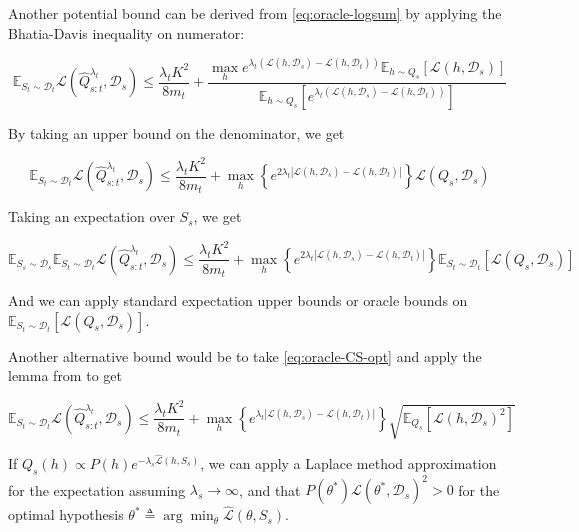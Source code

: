 \documentclass[letterpaper]{article}
\theoremstyle{definition}
\begin{document}
Another potential bound can be derived from \eqref{eq:oracle-logsum} by applying the Bhatia-Davis inequality on numerator:

$$\mathbb{E}_{S_t\sim \mathcal{D}_t}\mathcal{L}( \hat{Q}^{\lambda_t}_{s:t},\mathcal{D}_s)\leq \frac{\lambda_t K^2}{8m_t}+\frac{\max_h e^{\lambda_t(\mathcal{L}(h,\mathcal{D}_s)-\mathcal{L}(h,\mathcal{D}_t))}\mathbb{E}_{h\sim Q_s}\left [\mathcal{L}(h,\mathcal{D}_s) \right ]}{\mathbb{E}_{h\sim Q_s}\left [e^{\lambda_t(\mathcal{L}(h,\mathcal{D}_s)-\mathcal{L}(h,\mathcal{D}_t))}\right ]}$$

By taking an upper bound on the denominator, we get 

$$\mathbb{E}_{S_t\sim \mathcal{D}_t}\mathcal{L}( \hat{Q}^{\lambda_t}_{s:t},\mathcal{D}_s)\leq \frac{\lambda_t K^2}{8m_t}+\max_h \left \{ e^{2\lambda_t|\mathcal{L}(h,\mathcal{D}_s)-\mathcal{L}(h,\mathcal{D}_t)|}\right \}\mathcal{L}(Q_s,\mathcal{D}_s)$$

Taking an expectation over $S_s$, we get

\begin{equation}
\mathbb{E}_{S_s\sim \mathcal{D}_s}\mathbb{E}_{S_t\sim \mathcal{D}_t}\mathcal{L}( \hat{Q}^{\lambda_t}_{s:t},\mathcal{D}_s)\leq \frac{\lambda_t K^2}{8m_t}+\max_h \left \{ e^{2\lambda_t|\mathcal{L}(h,\mathcal{D}_s)-\mathcal{L}(h,\mathcal{D}_t)|}\right \}\mathbb{E}_{S_t\sim \mathcal{D}_t}\left [\mathcal{L}(Q_s,\mathcal{D}_s)\right ]
\end{equation}

And we can apply standard expectation upper bounds or oracle bounds on $\mathbb{E}_{S_t\sim \mathcal{D}_t}\left [\mathcal{L}(Q_s,\mathcal{D}_s)\right ]$.

Another alternative bound would be to take \eqref{eq:oracle-CS-opt} and apply the lemma from \citet{cover1996universal} to get 

$$\mathbb{E}_{S_t\sim \mathcal{D}_t}\mathcal{L}( \hat{Q}^{\lambda_t}_{s:t},\mathcal{D}_s)\leq \frac{\lambda_t K^2}{8m_t}+\max_h\left \{e^{\lambda_t|\mathcal{L}(h,\mathcal{D}_s)-\mathcal{L}(h,\mathcal{D}_t)|}\right \}\sqrt{\mathbb{E}_{Q_s}\left [\mathcal{L}(h,\mathcal{D}_s)^2 \right ]}$$

If $Q_s(h)\propto P(h)e^{-\lambda_s \hat{\mathcal{L}}(h,S_s)}$, we can apply a Laplace method approximation for the expectation assuming $\lambda_s\rightarrow \infty$, and that $P(\theta^*)\mathcal{L}(\theta^*,\mathcal{D}_s)^2>0$ for the optimal hypothesis $\theta^*\triangleq \arg\min_\theta \hat{\mathcal{L}}(\theta, S_s)$.
\end{document}
